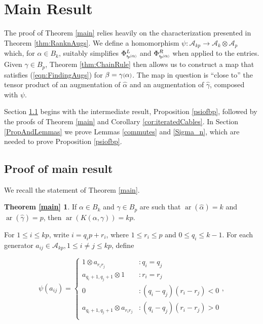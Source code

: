\documentclass[11pt]{amsart}
\def\A{{\mathcal A}}
\def\cl{\mathcal}
\def\s{{\sigma}}
\def\ar{\operatorname{ar}}
\newcommand*{\smallp}[1]{\scalebox{.75}{\ensuremath#1}}
\newcommand*{\subsmallp}[1]{\scalebox{.5}{\ensuremath#1}}
\newcommand{\subpp}[2][p]{\imath_{\hspace*{-1pt}#1}\hspace*{-.5pt}\subsmallp(#2\subsmallp)}
\theoremstyle{definition}
\begin{document}
\section{Main Result}
\label{SecMain}
The proof of Theorem \ref{main} relies heavily on the characterization presented in Theorem \ref{thm:RanknAugs}. We define a homomorphism $\psi:\cl A_{kp}\to\cl A_k\otimes\cl A_p$ which, for $\alpha\in B_k$, suitably simplifies $\Phi_{\subpp\alpha}^L$ and $\Phi_{\subpp\alpha}^R$ when applied to the entries. Given $\gamma\in B_p$, Theorem \ref{thm:ChainRule} then allows us to construct a map that satisfies (\ref{eqn:FindingAugs}) for $\beta=\gamma\smallp(\alpha\smallp)$. The map in question is ``close to'' the tensor product of an augmentation of $\hat\alpha$ and an augmentation of $\hat\gamma$, composed with $\psi$.

Section \ref{MainProof} begins with the intermediate result, Proposition \ref{psiofbp}, followed by the proofs of Theorem \ref{main} and Corollary \ref{cor:iteratedCables}.  In Section \ref{PropAndLemmas} we prove Lemmas \ref{commutes} and \ref{Sigma_n}, which are needed to prove Proposition \ref{psiofbp}.

\subsection{Proof of main result}
\label{MainProof}
We recall the statement of Theorem \ref{main}.

\newtheorem*{main}{Theorem \ref{main}}
\begin{main}
If $\alpha\in B_k$ and $\gamma\in B_p$ are such that $\ar(\hat{\alpha})=k$ and $\ar(\hat{\gamma})=p$, then $\ar(K(\alpha,\gamma))=kp$.
\end{main}


For $1\le i\le kp$, write $i = q_ip + r_i$, where $1\le r_i \le p$ and $0\le q_i\le k-1$.  For each generator $a_{ij}\in\A_{kp}, 1\le i\ne j\le kp$, define

\begin{equation}
\psi(a_{ij}) =
  \begin{cases}
         1\otimes a_{r_ir_j} & \colon q_i = q_j\\
         a_{q_i+1,q_j+1}\otimes 1 & \colon r_i = r_j\\
         0 & \colon (q_i-q_j)(r_i-r_j)<0\\
         a_{q_i+1,q_j+1}\otimes a_{r_ir_j} & \colon (q_i-q_j)(r_i-r_j)>0\\
  \end{cases},
  \label{defn:psi}
\end{equation}
\end{document}

